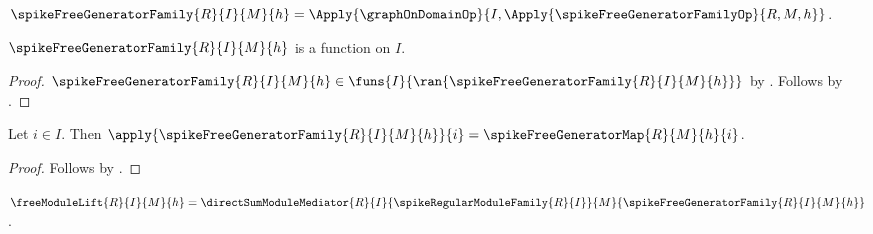 \begin{definition}\label{spike_free_generator_family}
    $\spikeFreeGeneratorFamily{R}{I}{M}{h}
        =\Apply{\graphOnDomainOp}{
            I,\Apply{\spikeFreeGeneratorFamilyOp}{R,M,h}}$.
\end{definition}

\begin{proposition}\label{spike_free_generator_family_type}
    $\spikeFreeGeneratorFamily{R}{I}{M}{h}$ is a function on $I$.
\end{proposition}
\begin{proof}
    $\spikeFreeGeneratorFamily{R}{I}{M}{h}\in
        \funs{I}{\ran{\spikeFreeGeneratorFamily{R}{I}{M}{h}}}$ by
        .
    Follows by .
\end{proof}

\begin{proposition}\label{spike_free_generator_family_apply}
    Let $i\in I$.
    Then
        $\apply{\spikeFreeGeneratorFamily{R}{I}{M}{h}}{i}
            =\spikeFreeGeneratorMap{R}{M}{h}{i}$.
\end{proposition}
\begin{proof}
    Follows by
        .
\end{proof}

\begin{definition}\label{spike_free_module_lift}
    $\freeModuleLift{R}{I}{M}{h}
        =\directSumModuleMediator
            {R}{I}{\spikeRegularModuleFamily{R}{I}}{M}{
                \spikeFreeGeneratorFamily{R}{I}{M}{h}}$.
\end{definition}

